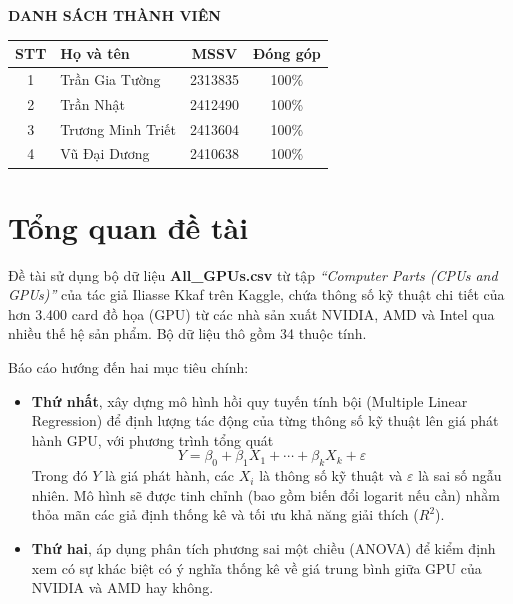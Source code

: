 \documentclass[a4paper]{article}
\begin{document}
	\newpage
	\thispagestyle{empty}
	\begin{center}
		\textbf{\Large DANH SÁCH THÀNH VIÊN}
	\end{center}
	
	\vspace{1cm}
	
	\begin{table}[H]
		\centering
		\renewcommand{\arraystretch}{1.5}
		\begin{tabular}{|c|l|c|c|}
			\hline
			\textbf{STT} & \textbf{Họ và tên} & \textbf{MSSV} & \textbf{Đóng góp} \\ \hline
			1 & Trần Gia Tường & 2313835 & 100\% \\ \hline
			2 & Trần Nhật & 2412490 & 100\% \\ \hline
			3 & Trương Minh Triết & 2413604 & 100\% \\ \hline
			4 & Vũ Đại Dương & 2410638 & 100\% \\ \hline
		\end{tabular}
	\end{table}
	
	\newpage
	\tableofcontents
	\newpage

\section{Tổng quan đề tài}

Đề tài sử dụng bộ dữ liệu \textbf{All\_GPUs.csv} từ tập \textit{``Computer Parts (CPUs and GPUs)''} của tác giả Iliasse Kkaf trên Kaggle, chứa thông số kỹ thuật chi tiết của hơn 3.400 card đồ họa (GPU) từ các nhà sản xuất NVIDIA, AMD và Intel qua nhiều thế hệ sản phẩm. Bộ dữ liệu thô gồm 34 thuộc tính.

Báo cáo hướng đến hai mục tiêu chính:
\begin{itemize}
	\item \textbf{Thứ nhất}, xây dựng mô hình hồi quy tuyến tính bội (Multiple Linear Regression) để định lượng tác động của từng thông số kỹ thuật lên giá phát hành GPU, với phương trình tổng quát 
	\begin{equation*}
		Y = \beta_0 + \beta_1 X_1 + \cdots + \beta_k X_k + \varepsilon
	\end{equation*}
	Trong đó $Y$ là giá phát hành, các $X_i$ là thông số kỹ thuật và $\varepsilon$ là sai số ngẫu nhiên. Mô hình sẽ được tinh chỉnh (bao gồm biến đổi logarit nếu cần) nhằm thỏa mãn các giả định thống kê và tối ưu khả năng giải thích ($R^2$).
	\item \textbf{Thứ hai}, áp dụng phân tích phương sai một chiều (ANOVA) để kiểm định xem có sự khác biệt có ý nghĩa thống kê về giá trung bình giữa GPU của NVIDIA và AMD hay không.
\end{itemize}
\end{document}
